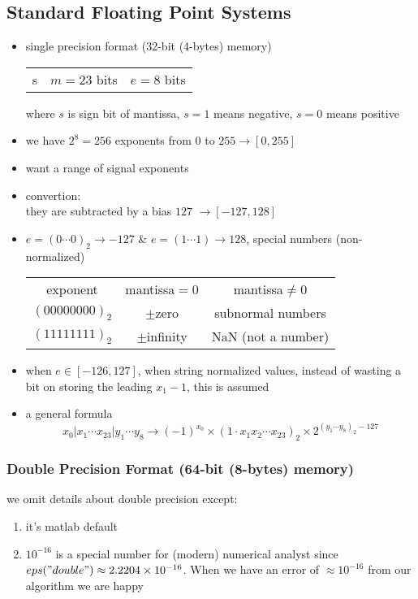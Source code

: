 \documentclass[11pt]{article}
\begin{document}
\subsection{Standard Floating Point Systems}
\begin{itemize}
  \item single precision format (32-bit (4-bytes) memory)
  \begin{center}
    \begin{tabular}{c|c|c}
      s &$m=23$ bits &$e=8$ bits
    \end{tabular}
  \end{center}
  where $s$ is sign bit of mantissa, $s=1$ means negative, $s=0$ means positive 
  \item we have $2^8=256$ exponents from $0$ to $255\rightarrow[0, 255]$
  \item want a range of signal exponents 
  \item convertion: \\
  they are subtracted by a bias $127$ $\rightarrow[-127,128]$
  \item $e=(0\cdots0)_2\rightarrow-127$ \& $e=(1\cdots1)\rightarrow128$, special numbers (non-normalized)
  \begin{center}
    \begin{tabular}{c|c|c}
      exponent &mantissa$=0$ &mantissa$\neq0$ \\
      $(00000000)_2$ &$\pm$zero &subnormal numbers \\
      $(11111111)_2$ &$\pm$infinity &NaN (not a number)
    \end{tabular}
  \end{center}
  \item when $e\in[-126, 127]$, when string normalized values, instead of wasting a bit on storing the leading $x_1-1$, this is assumed
  \item a general formula 
  \[x_0 | x_1\cdots x_{23} | y_1\cdots y_8\rightarrow (-1)^{x_0}\times(1\cdot x_1x_2\cdots x_{23})_2\times 2^{(y_1\cdots y_8)_2-127}\]
\end{itemize}
\subsubsection{Double Precision Format (64-bit (8-bytes) memory)}
we omit details about double precision except: 
\begin{enumerate}
  \item it's matlab default
  \item $10^{-16}$ is a special number for (modern) numerical analyst since $eps("double")\approx 2.2204\times 10^{-16}$. When we have an error of $\approx 10^{-16}$ from our algorithm we are happy
\end{enumerate}
\end{document}
